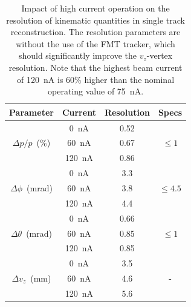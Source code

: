 \documentclass[final,3p,twocolumn]{elsarticle}
\begin{document}
\begin{table}[htbp!]
\begin{center}
\begin{tabular}{c|c|c|c} \hline
  Parameter & Current & Resolution &Specs \\ \hline
  & 0~nA  & 0.52 & \\
$\Delta{p}/p$~(\%) &60~nA &  0.67& $\le 1$\\
& 120~nA &  0.86 &  \\ \hline 
&0~nA &  3.3 &  \\
$\Delta \phi$~(mrad)& 60~nA &  3.8 &  $\le 4.5$\\
&120~nA  & 4.4 &  \\ \hline
&0~nA &  0.66 &  \\
$\Delta \theta$~(mrad)& 60~nA &  0.85 &  $\le 1$\\
&120~nA  & 0.85 &  \\ \hline
& 0~nA & 3.5 &  \\
$\Delta{v_z}$~(mm) & 60~nA & 4.6 & -  \\
& 120~nA & 5.6 & \\ \hline
\end{tabular}
\caption{Impact of high current operation on the resolution of kinematic quantities in single track reconstruction.
The resolution parameters are without the use of the FMT tracker, which should significantly improve the $v_z$-vertex 
resolution.
  Note that the highest beam current of 120~nA is 60\% higher than the nominal operating value of 75~nA.}     
\label{resolution}
\end{center}
\end{table}


\end{document}
